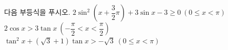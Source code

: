 다음 부등식을 푸시오.
 $2\sin^2\left(x+\dfrac{3}{2}\pi\right)+3\sin x-3\ge 0\ (0\le x<\pi)$
 $2\cos x>3\tan x\ \left(-\dfrac{\pi}{2}<x<\dfrac{\pi}{2}\right)$
 $\tan^2 x+(\sqrt{3}+1)\tan x>-\sqrt{3}\ (0\le x<\pi)$

